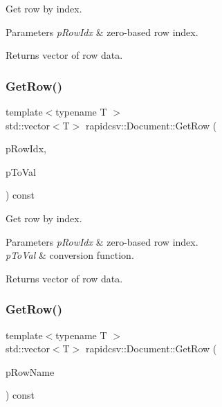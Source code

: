 Get row by index. 


\begin{DoxyParams}{Parameters}
{\em p\+Row\+Idx} & zero-\/based row index. \\
\hline
\end{DoxyParams}
\begin{DoxyReturn}{Returns}
vector of row data. 
\end{DoxyReturn}
\mbox{\label{classrapidcsv_1_1Document_a23eb34d1e433ef6d6bc5130f589c4d5a}} 
\subsubsection{\texorpdfstring{Get\+Row()}{GetRow()}\hspace{0.1cm}{\footnotesize\ttfamily [2/4]}}
{\footnotesize\ttfamily template$<$typename T $>$ \\
std\+::vector$<$T$>$ rapidcsv\+::\+Document\+::\+Get\+Row (\begin{DoxyParamCaption}\item[{const size\+\_\+t}]{p\+Row\+Idx,  }\item[{Conv\+Func$<$ T $>$}]{p\+To\+Val }\end{DoxyParamCaption}) const\hspace{0.3cm}{\ttfamily [inline]}}



Get row by index. 


\begin{DoxyParams}{Parameters}
{\em p\+Row\+Idx} & zero-\/based row index. \\
\hline
{\em p\+To\+Val} & conversion function. \\
\hline
\end{DoxyParams}
\begin{DoxyReturn}{Returns}
vector of row data. 
\end{DoxyReturn}
\mbox{\label{classrapidcsv_1_1Document_a71e274f4c612ac74fc8804c0b90a5839}} 
\subsubsection{\texorpdfstring{Get\+Row()}{GetRow()}\hspace{0.1cm}{\footnotesize\ttfamily [3/4]}}
{\footnotesize\ttfamily template$<$typename T $>$ \\
std\+::vector$<$T$>$ rapidcsv\+::\+Document\+::\+Get\+Row (\begin{DoxyParamCaption}\item[{const std\+::string \&}]{p\+Row\+Name }\end{DoxyParamCaption}) const\hspace{0.3cm}{\ttfamily [inline]}}



